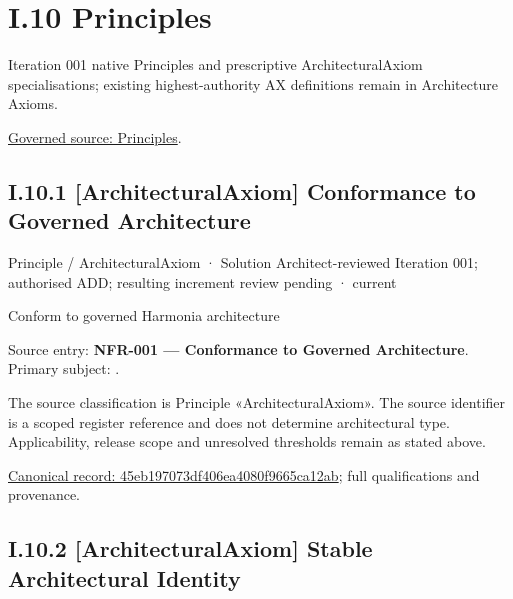 \chapter*{I.10 Principles}
\label{navigation:I.10}

Iteration 001 native Principles and prescriptive ArchitecturalAxiom specialisations; existing highest-authority AX definitions remain in Architecture Axioms.\par
\href{../../../../../../offline-design/Harmoni-NFR-Derived Architetural Elements - Iteration 001.md}{Governed source: Principles}.\par
\section*{I.10.1 [ArchitecturalAxiom] Conformance to Governed Architecture}
\label{navigation:I.10.1}

\label{element:45eb197073df406ea4080f9665ca12ab}
{\small Principle / ArchitecturalAxiom · Solution Architect-reviewed Iteration 001; authorised ADD; resulting increment review pending · current}\par

Conform to governed Harmonia architecture



Source entry: \textbf{NFR-001 — Conformance to Governed Architecture}. Primary subject: \texttt{}.



The source classification is Principle «ArchitecturalAxiom». The source identifier is a scoped register reference and does not determine architectural type. Applicability, release scope and unresolved thresholds remain as stated above.


{\footnotesize \href{../../../../../../../continuum/motivation/principle/architectural-axiom/45eb197073df406ea4080f9665ca12ab.md}{Canonical record: 45eb197073df406ea4080f9665ca12ab}; full qualifications and provenance.}\par
\section*{I.10.2 [ArchitecturalAxiom] Stable Architectural Identity}
\label{navigation:I.10.2}

